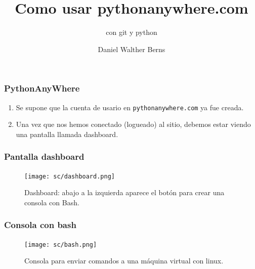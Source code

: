 \documentclass[11pt]{beamer}
\begin{document}
	\author{Daniel Walther Berns}
	\title{Como usar pythonanywhere.com}
	\subtitle{con git y python}
	\date{}
	\begin{frame}[plain]
		\maketitle
	\end{frame}
	
	\begin{frame}[fragile]
		\frametitle{PythonAnyWhere}
		
		\begin{enumerate}
		\item Se supone que la cuenta de usario en \verb-pythonanywhere.com- ya fue creada.
		
		\item Una vez que nos hemos conectado (logueado) al sitio, debemos estar viendo una pantalla llamada dashboard.
		
		\end{enumerate}
	\end{frame}

\begin{frame}
	\frametitle{Pantalla dashboard}
\begin{figure}
	\centering
	\texttt{[image: sc/dashboard.png]}
	\caption{Dashboard: abajo a la izquierda aparece el botón para crear una consola con Bash.}
	\label{fig:dashboard}
\end{figure}
\end{frame}

\begin{frame}[fragile]
	\frametitle{Consola con bash}
\begin{figure}
	\centering
	\texttt{[image: sc/bash.png]}
	\caption{Consola para enviar comandos a una máquina virtual con linux.}
	\label{fig:bash}
\end{figure}

\end{frame}
\end{document}
